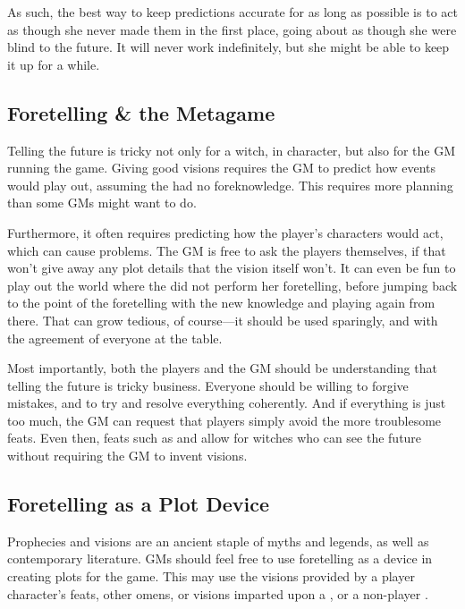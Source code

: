 As such, the best way to keep predictions accurate for as long as possible is to act as though she never made them in the first place, going about as though she were blind to the future.
It will never work indefinitely, but she might be able to keep it up for a while.

\subsection{Foretelling \& the Metagame}

Telling the future is tricky not only for a witch, in character, but also for the GM running the game.
Giving good visions requires the GM to predict how events would play out, assuming the  had no foreknowledge.
This requires more planning than some GMs might want to do.

Furthermore, it often requires predicting how the player's characters would act, which can cause problems.
The GM is free to ask the players themselves, if that won't give away any plot details that the vision itself won't.
It can even be fun to play out the world where the  did not perform her foretelling, before jumping back to the point of the foretelling with the  new knowledge and playing again from there.
That can grow tedious, of course---it should be used sparingly, and with the agreement of everyone at the table.

Most importantly, both the players and the GM should be understanding that telling the future is tricky business.
Everyone should be willing to forgive mistakes, and to try and resolve everything coherently.
And if everything is just too much, the GM can request that players simply avoid the more troublesome feats.
Even then, feats such as  and  allow for witches who can see the future without requiring the GM to invent visions.

\subsection{Foretelling as a Plot Device}

Prophecies and visions are an ancient staple of myths and legends, as well as contemporary literature.
GMs should feel free to use foretelling as a device in creating plots for the game.
This may use the visions provided by a player character's feats, other omens, or visions imparted upon a , or a non-player .

